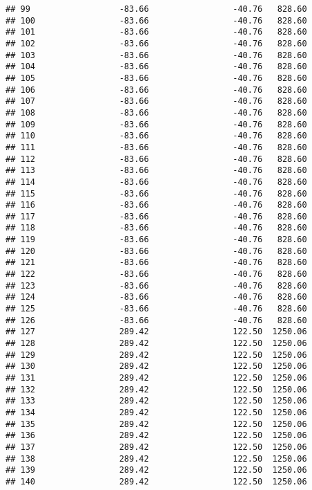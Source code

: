 \documentclass[]{article}
\begin{document}
\begin{verbatim}
## 99                  -83.66                 -40.76   828.60
## 100                 -83.66                 -40.76   828.60
## 101                 -83.66                 -40.76   828.60
## 102                 -83.66                 -40.76   828.60
## 103                 -83.66                 -40.76   828.60
## 104                 -83.66                 -40.76   828.60
## 105                 -83.66                 -40.76   828.60
## 106                 -83.66                 -40.76   828.60
## 107                 -83.66                 -40.76   828.60
## 108                 -83.66                 -40.76   828.60
## 109                 -83.66                 -40.76   828.60
## 110                 -83.66                 -40.76   828.60
## 111                 -83.66                 -40.76   828.60
## 112                 -83.66                 -40.76   828.60
## 113                 -83.66                 -40.76   828.60
## 114                 -83.66                 -40.76   828.60
## 115                 -83.66                 -40.76   828.60
## 116                 -83.66                 -40.76   828.60
## 117                 -83.66                 -40.76   828.60
## 118                 -83.66                 -40.76   828.60
## 119                 -83.66                 -40.76   828.60
## 120                 -83.66                 -40.76   828.60
## 121                 -83.66                 -40.76   828.60
## 122                 -83.66                 -40.76   828.60
## 123                 -83.66                 -40.76   828.60
## 124                 -83.66                 -40.76   828.60
## 125                 -83.66                 -40.76   828.60
## 126                 -83.66                 -40.76   828.60
## 127                 289.42                 122.50  1250.06
## 128                 289.42                 122.50  1250.06
## 129                 289.42                 122.50  1250.06
## 130                 289.42                 122.50  1250.06
## 131                 289.42                 122.50  1250.06
## 132                 289.42                 122.50  1250.06
## 133                 289.42                 122.50  1250.06
## 134                 289.42                 122.50  1250.06
## 135                 289.42                 122.50  1250.06
## 136                 289.42                 122.50  1250.06
## 137                 289.42                 122.50  1250.06
## 138                 289.42                 122.50  1250.06
## 139                 289.42                 122.50  1250.06
## 140                 289.42                 122.50  1250.06

\end{verbatim}
\end{document}
